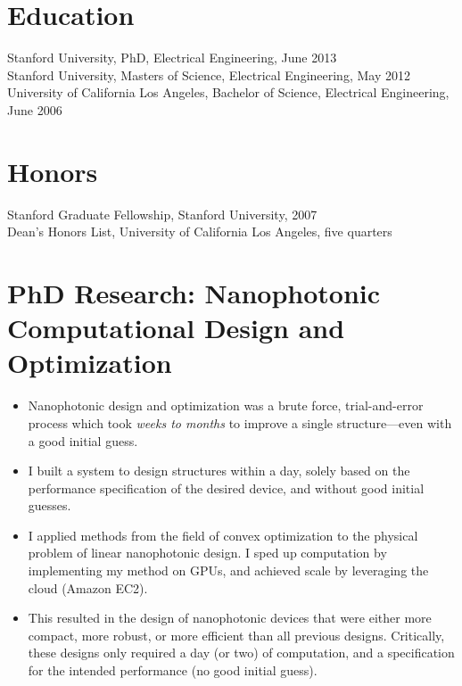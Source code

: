 \documentclass{res}
\begin{document}
 

\address{\texttt{jesselu@stanford.edu} \\ 66 Newell Rd. Apt. O \\ East Palo Alto, CA \\ (408) 568-9356}
                                  
\begin{resume}

\section{Education}          
    Stanford University, PhD, Electrical Engineering, June 2013 \\
    Stanford University, Masters of Science, Electrical Engineering, May 2012 \\
    University of California Los Angeles, Bachelor of Science, Electrical Engineering, June 2006

\section{Honors}
    Stanford Graduate Fellowship, Stanford University, 2007 \\
    Dean's Honors List, University of California Los Angeles, five quarters

\section{PhD Research: Nanophotonic Computational Design and Optimization}
\begin{itemize}
\item Nanophotonic design and optimization was 
    a brute force, trial-and-error process
    which took \emph{weeks to months} to improve a single structure---even with 
    a good initial guess.
\item I built a system to design structures within a day,
    solely based on the performance specification of the desired device,
    and without good initial guesses.
\item I applied methods from the field of convex optimization 
    to the physical problem of linear nanophotonic design. 
    I sped up computation by implementing my method on GPUs,
    and achieved scale by leveraging the cloud (Amazon EC2).
\item This resulted in the design 
    of nanophotonic devices that were either
    more compact, more robust, or more efficient 
    than all previous designs.
    Critically, these designs only required a day (or two) of computation,
    and a specification for the intended performance (no good initial guess).
    \end{itemize}


\end{resume}
\end{document}
